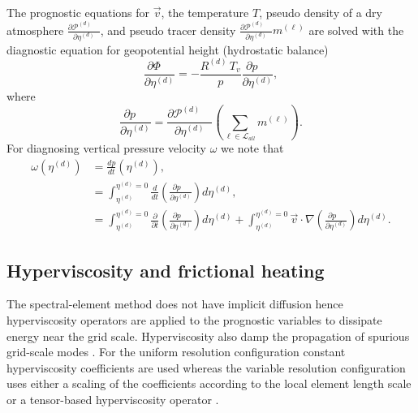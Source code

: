 \documentclass{agujournal}
\begin{document}
The prognostic equations for $\vec{v}$, the temperature $T$, pseudo density of a dry atmosphere ${\frac{\partial {\mathcal{P}^{(d)}}\quad }{\partial \eta^{(d)}}}$, and pseudo tracer density ${\frac{\partial {\mathcal{P}^{(d)}}\quad }{\partial \eta^{(d)}}} m^{(\ell)}$ are solved with the diagnostic equation for geopotential height (hydrostatic balance)
\begin{equation}
\frac{\partial \Phi\quad }{\partial \eta^{(d)}}=-\frac{R^{(d)} \,T_v}{p}\frac{\partial p\quad }{\partial \eta^{(d)}},\label{eq:phi_1}
\end{equation}
where
\begin{equation}
\frac{\partial p\quad }{\partial \eta^{(d)}}=\frac{\partial \mathcal{P}^{(d)}\quad }{\partial \eta^{(d)}}\left( \sum_{\ell \in \mathcal{L}_{all}} m^{(\ell)}\right).
\end{equation}
For diagnosing vertical pressure velocity $\omega$ we note that
\begin{align}
\omega(\eta^{(d)})&=\frac{dp}{dt}(\eta^{(d)}),\\
      &=\int_{\eta^{(d)}}^{\eta^{(d)}=0}\frac{d}{dt}\left( \frac{\partial p\quad }{\partial \eta^{(d)}}\right)d\eta^{(d)},\\
      &=\int_{\eta^{(d)}}^{\eta^{(d)}=0}\frac{\partial}{\partial t}\left( \frac{\partial p\quad }{\partial \eta^{(d)}}\right)d\eta^{(d)}+\int_{\eta^{(d)}}^{\eta^{(d)}=0} \vec{v}\cdot \nabla \left( \frac{\partial p\quad }{\partial \eta^{(d)}}\right)d\eta^{(d)}.\label{eq:omega}
\end{align}
\subsection{Hyperviscosity and frictional heating}
The spectral-element method does not have implicit diffusion hence hyperviscosity operators are applied to the prognostic variables to dissipate energy near the grid scale. Hyperviscosity also damp the propagation of spurious grid-scale modes \citep{AW2009SIAM}. For the uniform resolution configuration constant hyperviscosity coefficients are used whereas the variable resolution configuration uses either a scaling of the coefficients according to the local element length scale \citep{ZJT2013} or a tensor-based hyperviscosity operator \citep{GetAl2014GMD}.
\end{document}
